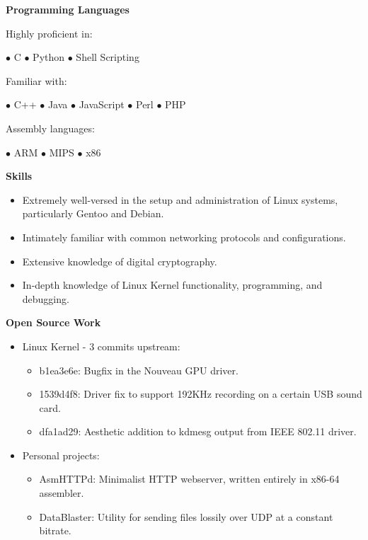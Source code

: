 \documentclass[11pt]{article}
\begin{document}
\begin{multicols}{2}

\centerline{\bf Programming Languages}
\bigskip
\noindent Highly proficient in:\\
\centerline{\hfill $\bullet$ C \hfill $\bullet$ Python \hfill $\bullet$ Shell Scripting \hfill}
\noindent Familiar with:\\
\centerline{\hfill $\bullet$ C++ \hfill $\bullet$ Java \hfill $\bullet$ JavaScript \hfill $\bullet$ Perl \hfill $\bullet$ PHP \hfill}
\noindent Assembly languages:\\
\centerline{\hfill $\bullet$ ARM \hfill $\bullet$ MIPS \hfill $\bullet$ x86 \hfill}

\bigskip

\centerline{\bf Skills}
\begin{itemize}[leftmargin=*]
\itemsep 0em
	\item Extremely well-versed in the setup and administration of Linux
	systems, particularly Gentoo and Debian.
	\item Intimately familiar with common networking protocols and configurations.
	\item Extensive knowledge of digital cryptography.
	\item In-depth knowledge of Linux Kernel functionality, programming, and debugging.
\end{itemize}

\columnbreak

\centerline{\bf Open Source Work}
\begin{itemize}[leftmargin=*]
\itemsep 0em
	\item Linux Kernel - 3 commits upstream:
	\begin{itemize}
	\itemsep 0em
		\item b1ea3e6e: Bugfix in the Nouveau GPU driver.
		\item 1539d4f8: Driver fix to support 192KHz recording on a certain USB sound card.
		\item dfa1ad29: Aesthetic addition to kdmesg output from IEEE 802.11 driver.
	\end{itemize}
	\item Personal projects:
	\begin{itemize}
	\itemsep 0em
		\item AsmHTTPd: Minimalist HTTP webserver, written entirely in x86-64 assembler.
		\item DataBlaster: Utility for sending files lossily over UDP at a constant bitrate.
	\end{itemize}
\end{itemize}

\end{multicols}
\end{document}
